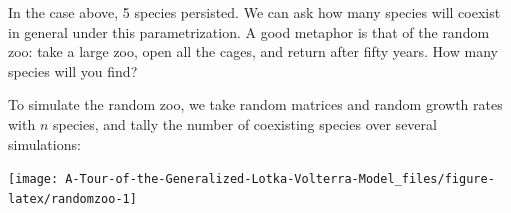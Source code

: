 \documentclass[
]{book}
\newenvironment{Shaded}{\begin{snugshade}}{\end{snugshade}}
\newcommand{\CommentTok}[1]{\textcolor[rgb]{0.56,0.35,0.01}{\textit{#1}}}
\newcommand{\ControlFlowTok}[1]{\textcolor[rgb]{0.13,0.29,0.53}{\textbf{#1}}}
\newcommand{\DataTypeTok}[1]{\textcolor[rgb]{0.13,0.29,0.53}{#1}}
\newcommand{\DecValTok}[1]{\textcolor[rgb]{0.00,0.00,0.81}{#1}}
\newcommand{\KeywordTok}[1]{\textcolor[rgb]{0.13,0.29,0.53}{\textbf{#1}}}
\newcommand{\NormalTok}[1]{#1}
\newcommand{\OperatorTok}[1]{\textcolor[rgb]{0.81,0.36,0.00}{\textbf{#1}}}
\newcommand{\OtherTok}[1]{\textcolor[rgb]{0.56,0.35,0.01}{#1}}
\newcommand{\StringTok}[1]{\textcolor[rgb]{0.31,0.60,0.02}{#1}}
\begin{document}
In the case above, 5 species persisted. We can ask how many species will coexist in general under this parametrization. A good metaphor is that of the random zoo: take a large zoo, open all the cages, and return after fifty years. How many species will you find?

To simulate the random zoo, we take random matrices and random growth rates with \(n\) species, and tally the number of coexisting species over several simulations:

\begin{Shaded}
\end{Shaded}

\begin{center}\texttt{[image: A-Tour-of-the-Generalized-Lotka-Volterra-Model\_files/figure-latex/randomzoo-1]} \end{center}
\end{document}
